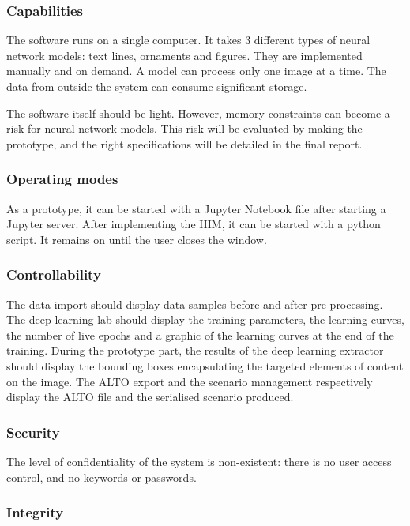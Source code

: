 \documentclass{polytech/polytech}
\numberwithin{figure}{chapter}
\begin{document}
\begin{appendix}
\subsubsection{Capabilities}

The software runs on a single computer. It takes 3 different types of neural network models: text lines, ornaments and figures. They are implemented manually and on demand. A model can process only one image at a time. The data from outside the system can consume significant storage.

The software itself should be light. However, memory constraints can become a risk for neural network models. This risk will be evaluated by making the prototype, and the right specifications will be detailed in the final report.

\subsubsection{Operating modes}

As a prototype, it can be started with a Jupyter Notebook file after starting a Jupyter server.
After implementing the HIM, it can be started with a python script. It remains on until the user closes the window.

\subsubsection{Controllability}

The data import should display data samples before and after pre-processing.
The deep learning lab should display the training parameters, the learning curves, the number of live epochs and a graphic of the learning curves at the end of the training.
During the prototype part, the results of the deep learning extractor should display the bounding boxes encapsulating the targeted elements of content on the image.
The ALTO export and the scenario management respectively display the ALTO file and the serialised scenario produced.

\subsubsection{Security}

The level of confidentiality of the system is non-existent: there is no user access control, and no keywords or passwords.

\subsubsection{Integrity}


\end{appendix}
\end{document}
